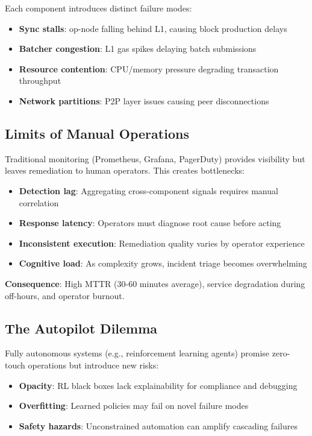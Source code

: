 \documentclass[11pt,a4paper]{article}
\begin{document}
Each component introduces distinct failure modes:
\begin{itemize}
    \item \textbf{Sync stalls}: op-node falling behind L1, causing block production delays
    \item \textbf{Batcher congestion}: L1 gas spikes delaying batch submissions
    \item \textbf{Resource contention}: CPU/memory pressure degrading transaction throughput
    \item \textbf{Network partitions}: P2P layer issues causing peer disconnections
\end{itemize}

\subsection{Limits of Manual Operations}

Traditional monitoring (Prometheus, Grafana, PagerDuty) provides visibility but leaves remediation to human operators. This creates bottlenecks:

\begin{itemize}
    \item \textbf{Detection lag}: Aggregating cross-component signals requires manual correlation
    \item \textbf{Response latency}: Operators must diagnose root cause before acting
    \item \textbf{Inconsistent execution}: Remediation quality varies by operator experience
    \item \textbf{Cognitive load}: As complexity grows, incident triage becomes overwhelming
\end{itemize}

\textbf{Consequence}: High MTTR (30-60 minutes average), service degradation during off-hours, and operator burnout.

\subsection{The Autopilot Dilemma}

Fully autonomous systems (e.g., reinforcement learning agents) promise zero-touch operations but introduce new risks:

\begin{itemize}
    \item \textbf{Opacity}: RL black boxes lack explainability for compliance and debugging
    \item \textbf{Overfitting}: Learned policies may fail on novel failure modes
    \item \textbf{Safety hazards}: Unconstrained automation can amplify cascading failures
\end{itemize}
\end{document}

